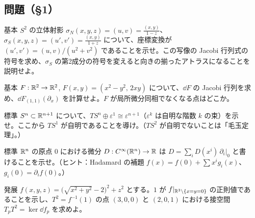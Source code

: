 \subsection*{問題（§1）}
\begin{prob}{基本}\label{p:stereo}
$S^2$ の立体射影 $\sigma_N(x,y,z)=(u,v)=\frac{(x,y)}{1-z}$、$\sigma_S(x,y,z)=(u',v')=\frac{(x,y)}{1+z}$ について、座標変換が $(u',v')=(u,v)/(u^2+v^2)$ であることを示せ。この写像の Jacobi 行列式の符号を求め、$\sigma_S$ の第2成分の符号を変えると向きの揃ったアトラスになることを説明せよ。
\end{prob}
\begin{prob}{基本}\label{p:Fmap}
$F:\mathbb R^2\to\mathbb R^2$, $F(x,y)=(x^2-y^2,\,2xy)$ について、$\dd F$ の Jacobi 行列を求め、$\dd F_{(1,1)}(\partial_x)$ を計算せよ。$F$ が局所微分同相でなくなる点はどこか。
\end{prob}
\begin{prob}{標準}\label{p:TSn}
$S^n\subset\mathbb R^{n+1}$ について、$TS^n\oplus\varepsilon^1\cong\varepsilon^{n+1}$（$\varepsilon^k$ は自明な階数 $k$ の束）を示せ。ここから $TS^1$ が自明であることを導け。（$TS^2$ が自明でないことは「毛玉定理」\tC。）
\end{prob}
\begin{prob}{標準}\label{p:hadamard}
$\mathbb R^n$ の原点 $0$ における微分 $D:C^\infty(\mathbb R^n)\to\mathbb R$ は $D=\sum_iD(x^i)\,\partial_i|_0$ と書けることを示せ。（ヒント：Hadamard の補題 $f(x)=f(0)+\sum x^ig_i(x)$、$g_i(0)=\partial_if(0)$。）
\end{prob}
\begin{prob}{発展}\label{p:torus}
$f(x,y,z)=\bigl(\sqrt{x^2+y^2}-2\bigr)^2+z^2$ とする。$1$ が $f|_{\mathbb R^3\setminus\{x=y=0\}}$ の正則値であることを示し、$T^2=f^{-1}(1)$ の点 $(3,0,0)$ と $(2,0,1)$ における接空間 $T_pT^2=\ker \dd f_p$ を求めよ。
\end{prob}
